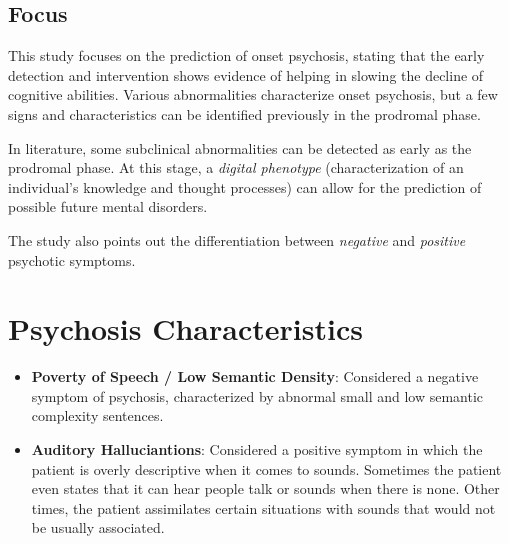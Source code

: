 \documentclass{Paper_Summary}
\begin{document}
\makepapertitle

\breakline

\begin{center}
    \section*{Focus}
\end{center}

    This study focuses on the prediction of onset psychosis, stating that the early detection and intervention shows evidence of helping in slowing the decline of cognitive abilities. Various abnormalities characterize onset psychosis, but a few signs and characteristics can be identified previously in the prodromal phase.

    In literature, some subclinical abnormalities can be detected as early as the prodromal phase. At this stage, a \emph{digital phenotype} (characterization of an individual's knowledge and thought processes) can allow for the prediction of possible future mental disorders.

    The study also points out the differentiation between \emph{negative} and \emph{positive} psychotic symptoms.

\breakline

\newpage

\section{Psychosis Characteristics}
    \begin{itemize}
        \item \textbf{Poverty of Speech / Low Semantic Density}: Considered a negative symptom of psychosis, characterized by abnormal small and low semantic complexity sentences.
        \item \textbf{Auditory Halluciantions}: Considered a positive symptom in which the patient is overly descriptive when it comes to sounds. Sometimes the patient even states that it can hear people talk or sounds when there is none. Other times, the patient assimilates certain situations with sounds that would not be usually associated.
    \end{itemize}
\end{document}
